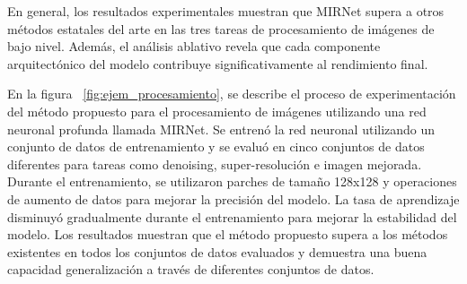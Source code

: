 \documentclass[a4paper,
               ]{jacow}
\begin{document}
En general, los resultados experimentales muestran que MIRNet supera a otros métodos estatales del arte en las tres tareas de procesamiento de imágenes de bajo nivel. Además, el análisis ablativo revela que cada componente arquitectónico del modelo contribuye significativamente al rendimiento final.

En la figura ~\ref{fig:ejem_procesamiento}, se describe el proceso de experimentación del método propuesto para el procesamiento de imágenes utilizando una red neuronal profunda llamada MIRNet. Se entrenó la red neuronal utilizando un conjunto de datos de entrenamiento y se evaluó en cinco conjuntos de datos diferentes para tareas como denoising, super-resolución e imagen mejorada. Durante el entrenamiento, se utilizaron parches de tamaño 128x128 y operaciones de aumento de datos para mejorar la precisión del modelo. La tasa de aprendizaje disminuyó gradualmente durante el entrenamiento para mejorar la estabilidad del modelo. Los resultados muestran que el método propuesto supera a los métodos existentes en todos los conjuntos de datos evaluados y demuestra una buena capacidad generalización a través de diferentes conjuntos de datos.
\end{document}
